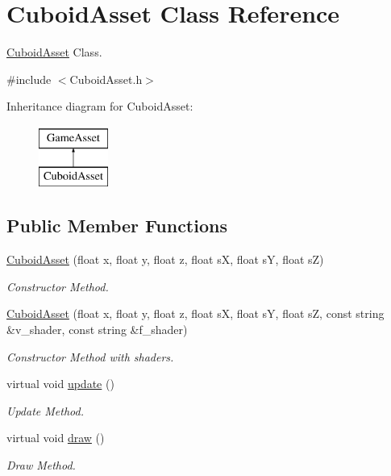 \hypertarget{classCuboidAsset}{\section{Cuboid\-Asset Class Reference}
\label{classCuboidAsset}
}


\hyperlink{classCuboidAsset}{Cuboid\-Asset} Class.  




{\ttfamily \#include $<$Cuboid\-Asset.\-h$>$}

Inheritance diagram for Cuboid\-Asset\-:\begin{figure}[H]
\begin{center}
\leavevmode
\includegraphics[height=2.000000cm]{classCuboidAsset}
\end{center}
\end{figure}
\subsection*{Public Member Functions}
\begin{DoxyCompactItemize}
\item 
\hyperlink{classCuboidAsset_a05c45a76a82b779f130b0b5828d791c2}{Cuboid\-Asset} (float x, float y, float z, float s\-X, float s\-Y, float s\-Z)
\begin{DoxyCompactList}\small\item\em Constructor Method. \end{DoxyCompactList}\item 
\hyperlink{classCuboidAsset_a9cd02d7fe04750239b9ef2245340c3c6}{Cuboid\-Asset} (float x, float y, float z, float s\-X, float s\-Y, float s\-Z, const string \&v\-\_\-shader, const string \&f\-\_\-shader)
\begin{DoxyCompactList}\small\item\em Constructor Method with shaders. \end{DoxyCompactList}\item 
virtual void \hyperlink{classCuboidAsset_a840b611da0e48bafef023ff98d97cf5b}{update} ()
\begin{DoxyCompactList}\small\item\em Update Method. \end{DoxyCompactList}\item 
virtual void \hyperlink{classCuboidAsset_adf627dc1cad3cfe5a039d829b4ad2c32}{draw} ()
\begin{DoxyCompactList}\small\item\em Draw Method. \end{DoxyCompactList}\end{DoxyCompactItemize}
